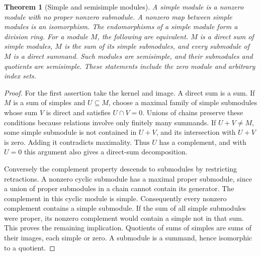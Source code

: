 \documentclass[11pt,oneside,openany]{book}
\newtheorem{theorem}{Theorem}[chapter]
\theoremstyle{definition}
\theoremstyle{remark}
\begin{document}
\begin{theorem}[Simple and semisimple modules]\label{p103:ALG-03-C03-R03}
A simple module is a nonzero module with no proper nonzero
submodule. A nonzero map between simple modules is an isomorphism.
The endomorphisms of a simple module form a division ring.
For a module \(M\), the following are equivalent.
\(M\) is a direct sum of simple modules, \(M\) is the sum of its
simple submodules, and every submodule of \(M\) is a direct
summand. Such modules are semisimple, and their submodules and
quotients are semisimple. These statements include the zero
module and arbitrary index sets.
\end{theorem}
\begin{proof}
For the first assertion take the kernel and image. A direct
sum is a sum. If \(M\) is a sum of simples and \(U\subseteq M\),
choose a maximal family of simple submodules whose sum \(V\)
is direct and satisfies \(U\cap V=0\). Unions of chains preserve
these conditions because relations involve only finitely many
summands. If \(U+V\ne M\), some simple submodule is not contained
in \(U+V\), and its intersection with \(U+V\) is zero. Adding
it contradicts maximality. Thus \(U\) has a complement, and
with \(U=0\) this argument also gives a direct-sum decomposition.

Conversely the complement property descends to submodules by
restricting retractions. A nonzero cyclic submodule has a maximal
proper submodule, since a union of proper submodules in a chain
cannot contain its generator. The complement in this cyclic
module is simple. Consequently every nonzero complement contains
a simple submodule. If the sum of all simple submodules were proper,
its nonzero complement would contain a simple not in that sum.
This proves the remaining implication. Quotients of sums of
simples are sums of their images, each simple or zero.
A submodule is a summand, hence isomorphic to a quotient.
\end{proof}
\end{document}
